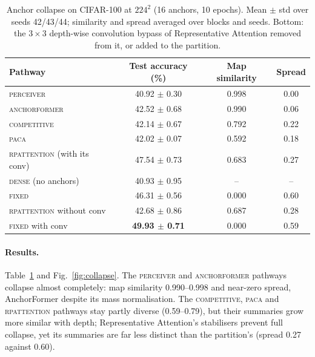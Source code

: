 \documentclass[10pt]{article}
\newcommand{\fixed}{\textsc{fixed}}
\begin{document}
\begin{table}[t]
\centering
\caption{Anchor collapse on CIFAR-100 at $224^2$ (16 anchors, 10 epochs). Mean $\pm$ std over
seeds 42/43/44; similarity and spread averaged over blocks and seeds. Bottom: the $3\times3$
depth-wise convolution bypass of Representative Attention removed from it, or added to the
partition.}
\label{tab:collapse}
\begin{tabular}{lccc}
\toprule
Pathway & Test accuracy (\%) & Map similarity & Spread \\
\midrule
\textsc{perceiver} & 40.92 $\pm$ 0.30 & 0.998 & 0.00 \\
\textsc{anchorformer} & 42.52 $\pm$ 0.68 & 0.990 & 0.06 \\
\textsc{competitive} & 42.14 $\pm$ 0.67 & 0.792 & 0.22 \\
\textsc{paca} & 42.02 $\pm$ 0.07 & 0.592 & 0.18 \\
\textsc{rpattention} (with its conv) & 47.54 $\pm$ 0.73 & 0.683 & 0.27 \\
\textsc{dense} (no anchors) & 40.93 $\pm$ 0.95 & -- & -- \\
\fixed{} & 46.31 $\pm$ 0.56 & 0.000 & 0.60 \\
\midrule
\textsc{rpattention} without conv & 42.68 $\pm$ 0.86 & 0.687 & 0.28 \\
\fixed{} with conv & \textbf{49.93 $\pm$ 0.71} & 0.000 & 0.59 \\
\bottomrule
\end{tabular}
\end{table}

\paragraph{Results.} Table~\ref{tab:collapse} and Fig.~\ref{fig:collapse}. The
\textsc{perceiver} and \textsc{anchorformer} pathways collapse almost completely: map similarity
0.990--0.998 and near-zero spread, AnchorFormer despite its mass normalisation. The
\textsc{competitive}, \textsc{paca} and \textsc{rpattention} pathways stay partly diverse
(0.59--0.79), but their summaries grow more similar with depth; Representative Attention's
stabilisers prevent full collapse, yet its summaries are far less distinct than the partition's
(spread 0.27 against 0.60).
\end{document}
